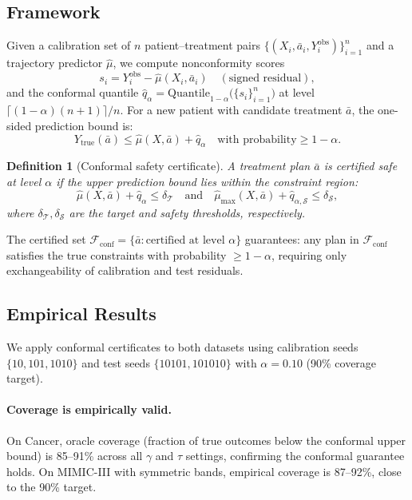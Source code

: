 \documentclass{article}
\newtheorem{definition}{Definition}
\newcommand{\ba}{\bar{a}}
\newcommand{\cT}{\mathcal{T}}
\newcommand{\cS}{\mathcal{S}}
\newcommand{\cF}{\mathcal{F}}
\begin{document}
\subsection{Framework}

Given a calibration set of $n$ patient--treatment pairs $\{(X_i, \ba_i, Y_i^{\mathrm{obs}})\}_{i=1}^n$ and a trajectory predictor $\hat{\mu}$, we compute nonconformity scores
\begin{equation}
\label{eq:nonconformity}
s_i = Y_i^{\mathrm{obs}} - \hat{\mu}(X_i, \ba_i) \quad (\text{signed residual}),
\end{equation}
and the conformal quantile $\hat{q}_\alpha = \mathrm{Quantile}_{1-\alpha}\bigl(\{s_i\}_{i=1}^n\bigr)$ at level $\lceil(1-\alpha)(n+1)\rceil / n$. For a new patient with candidate treatment $\ba$, the one-sided prediction bound is:
\begin{equation}
\label{eq:conformal_bound}
Y_{\mathrm{true}}(\ba) \leq \hat{\mu}(X, \ba) + \hat{q}_\alpha \quad \text{with probability} \geq 1-\alpha.
\end{equation}

\begin{definition}[Conformal safety certificate]
A treatment plan $\ba$ is \emph{certified safe at level $\alpha$} if the upper prediction bound lies within the constraint region:
\begin{equation}
\hat{\mu}(X, \ba) + \hat{q}_\alpha \leq \delta_{\cT} \quad \text{and} \quad \hat{\mu}_{\max}(X, \ba) + \hat{q}_{\alpha,\cS} \leq \delta_{\cS},
\end{equation}
where $\delta_\cT, \delta_\cS$ are the target and safety thresholds, respectively.
\end{definition}

\noindent The certified set $\cF_{\mathrm{conf}} = \{\ba : \text{certified at level } \alpha\}$ guarantees: any plan in $\cF_{\mathrm{conf}}$ satisfies the true constraints with probability $\geq 1-\alpha$, requiring only exchangeability of calibration and test residuals.

\subsection{Empirical Results}

We apply conformal certificates to both datasets using calibration seeds $\{10, 101, 1010\}$ and test seeds $\{10101, 101010\}$ with $\alpha = 0.10$ (90\% coverage target).

\paragraph{Coverage is empirically valid.} On Cancer, oracle coverage (fraction of true outcomes below the conformal upper bound) is 85--91\% across all $\gamma$ and $\tau$ settings, confirming the conformal guarantee holds. On MIMIC-III with symmetric bands, empirical coverage is 87--92\%, close to the 90\% target.
\end{document}
